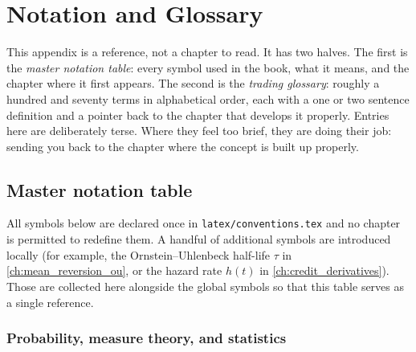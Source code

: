 \chapter{Notation and Glossary}
\label{ch:app_notation}

This appendix is a reference, not a chapter to read. It has two halves.
The first is the \emph{master notation table}: every symbol used in the
book, what it means, and the chapter where it first appears. The second
is the \emph{trading glossary}: roughly a hundred and seventy terms in
alphabetical order, each with a one or two sentence definition and a
pointer back to the chapter that develops it properly. Entries here are
deliberately terse. Where they feel too brief, they are doing their
job: sending you back to the chapter where the concept is built up
properly.

\section{Master notation table}
\label{sec:app_notation_master}

All symbols below are declared once in \texttt{latex/conventions.tex} and
no chapter is permitted to redefine them. A handful of additional
symbols are introduced locally (for example, the Ornstein--Uhlenbeck
half-life $\tau$ in \cref{ch:mean_reversion_ou}, or the hazard rate
$h(t)$ in \cref{ch:credit_derivatives}). Those are collected here
alongside the global symbols so that this table serves as a single
reference.

\subsection{Probability, measure theory, and statistics}

